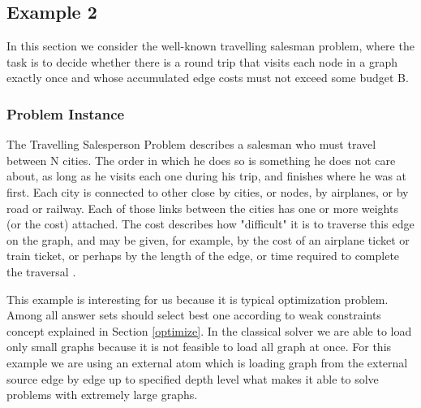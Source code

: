 \documentclass[a4paper, titlepage]{article}
\begin{document}
\subsection{Example 2}
\label{traveling}
In this section we consider the well-known travelling 
salesman problem, where the task is to decide whether there 
is a round trip that visits each node in a graph exactly 
once and whose accumulated edge costs must not exceed some 
budget B.

\subsubsection{Problem Instance}
The Travelling Salesperson Problem describes a salesman who 
must travel between N cities. The order in which he does so 
is something he does not care about, as long as he visits 
each one during his trip, and finishes where he was at 
first. Each city is connected to other close by cities, or 
nodes, by airplanes, or by road or railway. Each of those 
links between the cities has one or more weights (or the 
cost) attached. The cost describes how "difficult" it is to 
traverse this edge on the graph, and may be given, for 
example, by the cost of an airplane ticket or train ticket, 
or perhaps by the length of the edge, or time required to 
complete the traversal \cite{wiki}.

This example is interesting for us because it is typical 
optimization problem. Among all answer sets \dlvhex{} 
should select best one according to weak constraints 
concept explained in Section \ref{optimize}. In the 
classical solver we are able to load only small graphs 
because it is not feasible to load all graph at once. For 
this example we are using an external atom which is loading 
graph from the external source edge by edge up to specified 
depth level what makes it able to solve problems with 
extremely large graphs.        
\end{document}
